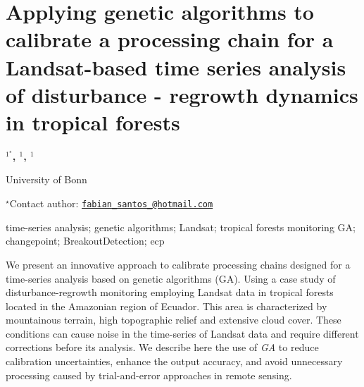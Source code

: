 \documentclass[\main/boa.tex]{subfiles}
\begin{document}
\section{Applying genetic algorithms to calibrate a processing chain for a
Landsat-based time series analysis of disturbance - regrowth dynamics in
tropical forests}

\begin{center}
  {\bf {}$^{1^\star}$, $^{1}$, $^{1}$}
\end{center}

\vskip 0.3cm

\begin{affiliations}
\begin{enumerate}
\begin{minipage}{0.915\textwidth}
\centering
\item University of Bonn \\[-2pt]
\end{minipage}
\end{enumerate}
$^\star$Contact author: \href{mailto:fabian_santos_@hotmail.com}{\nolinkurl{fabian\_santos\_@hotmail.com}}\\
\end{affiliations}

\vskip 0.5cm

\begin{minipage}{0.915\textwidth}
\keywords time-series analysis; genetic algorithms; Landsat; tropical forests
monitoring
\packages GA; changepoint; BreakoutDetection; ecp
\end{minipage}

\vskip 0.8cm

We present an innovative approach to calibrate processing chains
designed for a time-series analysis based on genetic algorithms (GA).
Using a case study of disturbance-regrowth monitoring employing Landsat
data in tropical forests located in the Amazonian region of Ecuador.
This area is characterized by mountainous terrain, high topographic
relief and extensive cloud cover. These conditions can cause noise in
the time-series of Landsat data and require different corrections before
its analysis. We describe here the use of \emph{GA} to reduce
calibration uncertainties, enhance the output accuracy, and avoid
unnecessary processing caused by trial-and-error approaches in remote
sensing.
\end{document}
